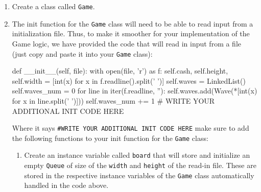 \documentclass{42-en}
\begin{document}
   \begin{enumerate}\itemsep7pt
    \item Create a class called \texttt{Game}.
    \item The init function for the \texttt{Game} class will need to be able to read input from a initialization file. Thus, to make it smoother for your implementation of the Game logic, we have provided the
    code that will read in input from a file (just copy and paste it into your \texttt{Game} class):
\begin{42pycode}
	def __init__(self, file):
		with open(file, 'r') as f:
			self.cash, self.height, self.width = [int(x) for x in f.readline().split(' ')]
			self.waves = LinkedList()
			self.waves_num = 0
			for line in iter(f.readline, ''):
				self.waves.add(Wave(*[int(x) for x in line.split(' ')]))
				self.waves_num += 1
		# WRITE YOUR ADDITIONAL INIT CODE HERE
\end{42pycode}
Where it says \texttt{\#WRITE YOUR ADDITIONAL INIT CODE HERE} make sure to add the following functions to your init function for the \texttt{Game} class:
   \begin{enumerate}\itemsep7pt
    \item Create an instance variable called \texttt{board} that will store and initialize an empty \texttt{Queue} of size of the \texttt{width} and \texttt{height} of the read-in file. These are stored in the respective instance variables of the \texttt{Game} class
    automatically handled in the code above. 
    

\end{enumerate}
\end{enumerate}
\end{document}
